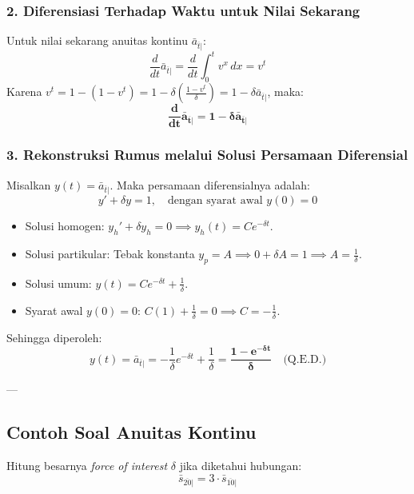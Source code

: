 \documentclass[11pt,a4paper]{article}
\begin{document}
\subsubsection{2. Diferensiasi Terhadap Waktu untuk Nilai Sekarang}
Untuk nilai sekarang anuitas kontinu $\bar{a}_{\overline{t}|}$:
\begin{equation}
    \frac{d}{dt} \bar{a}_{\overline{t}|} = \frac{d}{dt} \int_{0}^{t} v^x \, dx = v^t
\end{equation}
Karena $v^t = 1 - (1 - v^t) = 1 - \delta \left( \frac{1 - v^t}{\delta} \right) = 1 - \delta \bar{a}_{\overline{t}|}$, maka:
\begin{equation}
    \mathbf{\frac{d}{dt} \bar{a}_{\overline{t}|} = 1 - \delta \bar{a}_{\overline{t}|}}
\end{equation}

\subsubsection{3. Rekonstruksi Rumus melalui Solusi Persamaan Diferensial}
Misalkan $y(t) = \bar{a}_{\overline{t}|}$. Maka persamaan diferensialnya adalah:
\begin{equation*}
    y' + \delta y = 1, \quad \text{dengan syarat awal } y(0) = 0
\end{equation*}
\begin{itemize}
    \item Solusi homogen: $y_h' + \delta y_h = 0 \implies y_h(t) = C e^{-\delta t}$.
    \item Solusi partikular: Tebak konstanta $y_p = A \implies 0 + \delta A = 1 \implies A = \frac{1}{\delta}$.
    \item Solusi umum: $y(t) = C e^{-\delta t} + \frac{1}{\delta}$.
    \item Syarat awal $y(0) = 0$: $C (1) + \frac{1}{\delta} = 0 \implies C = -\frac{1}{\delta}$.
\end{itemize}
Sehingga diperoleh:
\begin{equation*}
    y(t) = \bar{a}_{\overline{t}|} = -\frac{1}{\delta} e^{-\delta t} + \frac{1}{\delta} = \mathbf{\frac{1 - e^{-\delta t}}{\delta}} \quad \text{(Q.E.D.)}
\end{equation*}

---

\subsection{Contoh Soal Anuitas Kontinu}

\begin{examplebox}
Hitung besarnya \textit{force of interest} $\delta$ jika diketahui hubungan:
\begin{equation*}
    \bar{s}_{\overline{20}|} = 3 \cdot \bar{s}_{\overline{10}|}
\end{equation*}
\end{examplebox}
\end{document}
